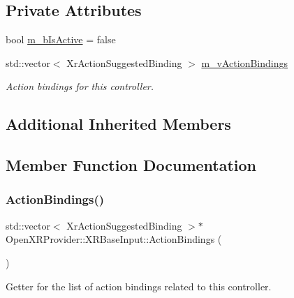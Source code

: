 \subsection*{Private Attributes}
\begin{DoxyCompactItemize}
\item 
bool \mbox{\hyperlink{class_open_x_r_provider_1_1_x_r_base_input_ac4e9180e8d2f782656c8e129f7555f17}{m\+\_\+b\+Is\+Active}} = false
\item 
std\+::vector$<$ Xr\+Action\+Suggested\+Binding $>$ \mbox{\hyperlink{class_open_x_r_provider_1_1_x_r_base_input_a52671a8bf80fb2c176d1bebde57ccc21}{m\+\_\+v\+Action\+Bindings}}
\begin{DoxyCompactList}\small\item\em Action bindings for this controller. \end{DoxyCompactList}\end{DoxyCompactItemize}
\subsection*{Additional Inherited Members}


\subsection{Member Function Documentation}
\mbox{\label{class_open_x_r_provider_1_1_x_r_base_input_a34ca74de38cbd5ebd6cfc6372518a104}} 
\subsubsection{\texorpdfstring{ActionBindings()}{ActionBindings()}}
{\footnotesize\ttfamily std\+::vector$<$ Xr\+Action\+Suggested\+Binding $>$$\ast$ Open\+X\+R\+Provider\+::\+X\+R\+Base\+Input\+::\+Action\+Bindings (\begin{DoxyParamCaption}{ }\end{DoxyParamCaption})\hspace{0.3cm}{\ttfamily [inline]}}



Getter for the list of action bindings related to this controller. 

\mbox{\label{class_open_x_r_provider_1_1_x_r_base_input_a139c33cb927e7b85970d66d35f76e154}} 
